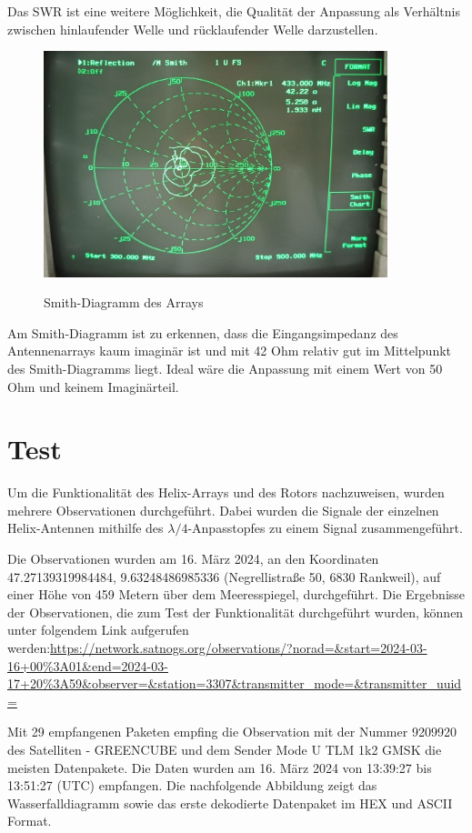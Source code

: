 Das SWR ist eine weitere Möglichkeit, die Qualität der Anpassung als Verhältnis zwischen hinlaufender Welle und rücklaufender Welle darzustellen.

\begin{figure}[H]
	\centering
	\includegraphics[width=10cm]{../ref/Array-Smith.jpg}
	\label{fig:array-Smith}
	\caption{Smith-Diagramm des Arrays}
\end{figure}

Am Smith-Diagramm ist zu erkennen, dass die Eingangsimpedanz des Antennenarrays kaum imaginär ist und mit 42 Ohm relativ gut im Mittelpunkt des Smith-Diagramms liegt. Ideal wäre die Anpassung mit einem Wert von 50 Ohm und keinem Imaginärteil.

\section{Test}
Um die Funktionalität des Helix-Arrays und des Rotors nachzuweisen, wurden mehrere Observationen durchgeführt. Dabei wurden die Signale der einzelnen Helix-Antennen mithilfe des $\lambda/4$-Anpasstopfes zu einem Signal zusammengeführt.

Die Observationen wurden am 16. März 2024, an den Koordinaten 47.27139319984484, 9.63248486985336 (Negrellistraße 50, 6830 Rankweil), auf einer Höhe von 459 Metern über dem Meeresspiegel, durchgeführt.  Die Ergebnisse der Observationen, die zum Test der Funktionalität durchgeführt wurden, können unter folgendem Link aufgerufen werden:\newline \url{https://network.satnogs.org/observations/?norad=&start=2024-03-16+00\%3A01\&end=2024-03-17+20\%3A59\&observer=\&station=3307\&transmitter_mode=\&transmitter_uuid=}

Mit 29 empfangenen Paketen empfing die Observation mit der Nummer 9209920 des Satelliten  - GREENCUBE\grqq{}  und dem Sender \glqq Mode U TLM 1k2 GMSK\grqq{} die meisten Datenpakete. Die Daten wurden am 16. März 2024 von 13:39:27 bis 13:51:27 (UTC) empfangen. Die nachfolgende Abbildung zeigt das Wasserfalldiagramm sowie das erste dekodierte Datenpaket im HEX und ASCII Format.

